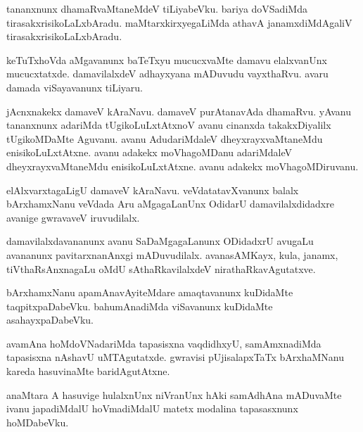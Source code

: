 \documentclass{article}
\begin{document}
\begin{mn}
tananxnunx  dhamaRvaMtaneMdeV  tiLiyabeVku.  bariya  doVSadiMda  tirasakxrisikoLaLxbAradu.  
maMtarxkirxyegaLiMda  athavA  janamxdiMdAgaliV  tirasakxrisikoLaLxbAradu.
\end{mn}

\begin{mn}
keTuTxhoVda  aMgavanunx  baTeTxyu  mucucxvaMte  damavu  elalxvanUnx  mucucxtatxde.  
damavilalxdeV  adhayxyana mADuvudu  vayxthaRvu.  avaru  damada  viSayavanunx  tiLiyaru.
\end{mn}

\begin{mn}
jAcnxnakekx  damaveV  kAraNavu.  damaveV  purAtanavAda  dhamaRvu.  yAvanu  tananxnunx  
adariMda  tUgikoLuLxtAtxnoV  avanu  cinanxda  takakxDiyalilx  tUgikoMDaMte  Aguvanu.  
avanu  AdudariMdaleV  dheyxrayxvaMtaneMdu  enisikoLuLxtAtxne.  avanu  adakekx  moVhagoMDanu  
adariMdaleV  dheyxrayxvaMtaneMdu  enisikoLuLxtAtxne.  avanu  adakekx  moVhagoMDiruvanu.
\end{mn}

\begin{mn}
elAlxvarxtagaLigU  damaveV  kAraNavu.  veVdatatavXvanunx balalx  bArxhamxNanu  veVdada  Aru  
aMgagaLanUnx  OdidarU  damavilalxdidadxre  avanige  gwravaveV  iruvudilalx.
\end{mn}

\begin{mn}
damavilalxdavananunx  avanu  SaDaMgagaLanunx  ODidadxrU  avugaLu  avananunx  
pavitarxnanAnxgi  mADuvudilalx.  avanasAMKayx,  kula,  janamx,  tiVthaRsAnxnagaLu  
oMdU  sAthaRkavilalxdeV  nirathaRkavAgutatxve.
\end{mn}

\begin{mn}
bArxhamxNanu  apamAnavAyiteMdare  amaqtavanunx  kuDidaMte  taqpitxpaDabeVku.  
bahumAnadiMda  viSavanunx  kuDidaMte  asahayxpaDabeVku. 
\end{mn}

\begin{mn}
avamAna hoMdoVNadariMda  tapasisxna  vaqdidhxyU,  samAmxnadiMda  tapasisxna  nAshavU  
uMTAgutatxde.  gwravisi  pUjisalapxTaTx  bArxhaMNanu  kareda  hasuvinaMte  baridAgutAtxne.
\end{mn}

\begin{mn}
anaMtara  A  hasuvige  hulalxnUnx  niVranUnx  hAki  samAdhAna  mADuvaMte  ivanu  japadiMdalU  
hoVmadiMdalU  matetx  modalina  tapasasxnunx  hoMDabeVku.
\end{mn}
\end{document}
